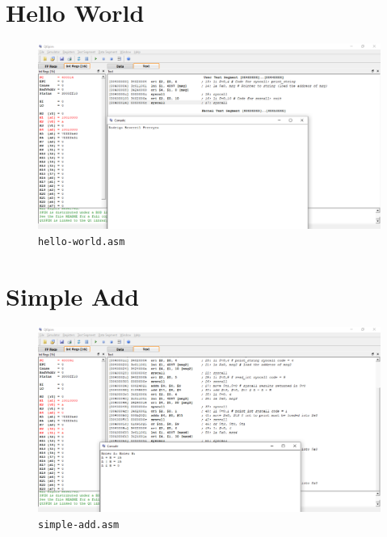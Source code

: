 \documentclass{article}
\renewcommand{\c}[1]{\texttt{#1}}
\begin{document}
\section{Hello World}
\begin{figure}[H]
    \centering
    \includegraphics[width=\textwidth]{Images/helloworld}
    \caption{\c{hello-world.asm}}
    \label{screenshot:hello-world}
\end{figure}

\section{Simple Add}
\begin{figure}[H]
    \centering
    \includegraphics[width=\textwidth]{Images/simpleadd}
    \caption{\c{simple-add.asm}}
    \label{screenshot:simple-add}
\end{figure}
\end{document}
